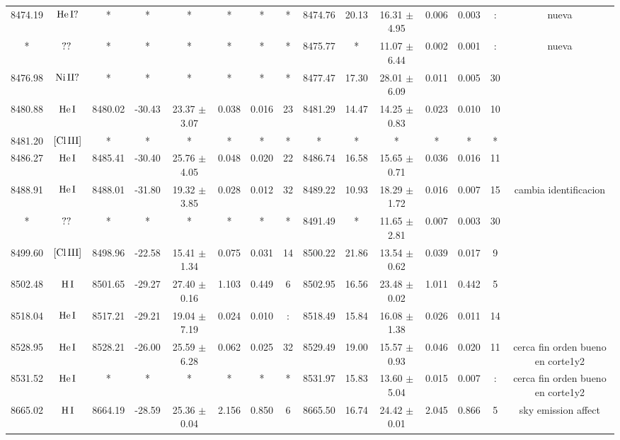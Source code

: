\documentclass{article}
\begin{document}
\begin{table*}
\begin{adjustbox}{width=\textwidth}
\begin{tabular}{ccccccccccccccc}
8474.19 & $\mbox{He}\thinspace \mbox{I?}$ & * & * & * & * & * & * & 8474.76 & 20.13 & 16.31 $\pm$ 4.95 & 0.006 & 0.003 & : &  nueva \\
* & $\mbox{??}\thinspace \mbox{}$ & * & * & * & * & * & * & 8475.77 & * & 11.07 $\pm$ 6.44 & 0.002 & 0.001 & : &  nueva \\
8476.98 & $\mbox{Ni}\thinspace \mbox{II?}$ & * & * & * & * & * & * & 8477.47 & 17.30 & 28.01 $\pm$ 6.09 & 0.011 & 0.005 & 30 &  \\
8480.88 & $\mbox{He}\thinspace \mbox{I}$ & 8480.02 & -30.43 & 23.37 $\pm$ 3.07 & 0.038 & 0.016 & 23 & 8481.29 & 14.47 & 14.25 $\pm$ 0.83 & 0.023 & 0.010 & 10 &  \\
8481.20 & $\mbox{[Cl}\thinspace \mbox{III]}$ & * & * & * & * & * & * & * & * & * & * & * & * &  \\
8486.27 & $\mbox{He}\thinspace \mbox{I}$ & 8485.41 & -30.40 & 25.76 $\pm$ 4.05 & 0.048 & 0.020 & 22 & 8486.74 & 16.58 & 15.65 $\pm$ 0.71 & 0.036 & 0.016 & 11 &  \\
8488.91 & $\mbox{He}\thinspace \mbox{I}$ & 8488.01 & -31.80 & 19.32 $\pm$ 3.85 & 0.028 & 0.012 & 32 & 8489.22 & 10.93 & 18.29 $\pm$ 1.72 & 0.016 & 0.007 & 15 &  cambia identificacion \\
* & $\mbox{??}\thinspace \mbox{}$ & * & * & * & * & * & * & 8491.49 & * & 11.65 $\pm$ 2.81 & 0.007 & 0.003 & 30 &  \\
8499.60 & $\mbox{[Cl}\thinspace \mbox{III]}$ & 8498.96 & -22.58 & 15.41 $\pm$ 1.34 & 0.075 & 0.031 & 14 & 8500.22 & 21.86 & 13.54 $\pm$ 0.62 & 0.039 & 0.017 & 9 &  \\
8502.48 & $\mbox{H}\thinspace \mbox{I}$ & 8501.65 & -29.27 & 27.40 $\pm$ 0.16 & 1.103 & 0.449 & 6 & 8502.95 & 16.56 & 23.48 $\pm$ 0.02 & 1.011 & 0.442 & 5 &  \\
8518.04 & $\mbox{He}\thinspace \mbox{I}$ & 8517.21 & -29.21 & 19.04 $\pm$ 7.19 & 0.024 & 0.010 & : & 8518.49 & 15.84 & 16.08 $\pm$ 1.38 & 0.026 & 0.011 & 14 &  \\
8528.95 & $\mbox{He}\thinspace \mbox{I}$ & 8528.21 & -26.00 & 25.59 $\pm$ 6.28 & 0.062 & 0.025 & 32 & 8529.49 & 19.00 & 15.57 $\pm$ 0.93 & 0.046 & 0.020 & 11 &  cerca fin orden bueno en corte1y2 \\
8531.52 & $\mbox{He}\thinspace \mbox{I}$ & * & * & * & * & * & * & 8531.97 & 15.83 & 13.60 $\pm$ 5.04 & 0.015 & 0.007 & : &  cerca fin orden bueno en corte1y2 \\
8665.02 & $\mbox{H}\thinspace \mbox{I}$ & 8664.19 & -28.59 & 25.36 $\pm$ 0.04 & 2.156 & 0.850 & 6 & 8665.50 & 16.74 & 24.42 $\pm$ 0.01 & 2.045 & 0.866 & 5 &  sky emission affect \\

\end{tabular}
\end{adjustbox}
\end{table*}
\end{document}
